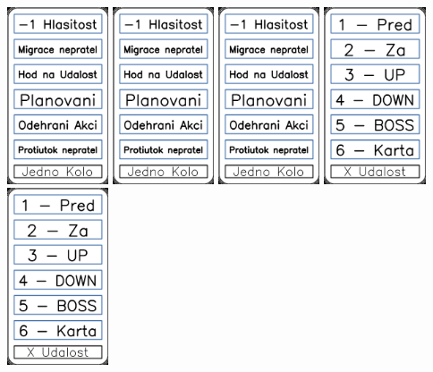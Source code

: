 \documentclass[a4paper]{article}
\begin{document}
	\includegraphics[width=3.0cm]{img-8_1}
	\includegraphics[width=3.0cm]{img-8_2}
	\includegraphics[width=3.0cm]{img-8_3}
	\includegraphics[width=3.0cm]{img-8_4}
	\includegraphics[width=3.0cm]{img-8_5}
\end{document}
